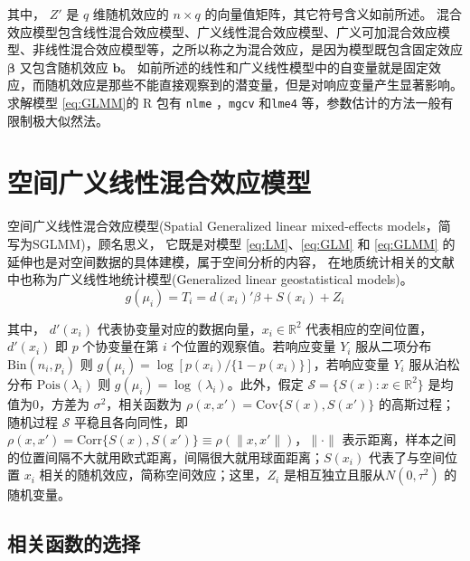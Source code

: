 \documentclass[hyperref, a4paper, UTF8, zihao = -4, linespread = 1.25, scheme = chinese]{ctexbook}
\begin{document}
其中， \(Z'\) 是 \(q\) 维随机效应的 \(n \times q\)
的向量值矩阵，其它符号含义如前所述。
混合效应模型包含线性混合效应模型、广义线性混合效应模型、广义可加混合效应模型、非线性混合效应模型等，之所以称之为混合效应，是因为模型既包含固定效应
\(\boldsymbol{\beta}\) 又包含随机效应 \(\mathbf{b}\)。
如前所述的线性和广义线性模型中的自变量就是固定效应，而随机效应是那些不能直接观察到的潜变量，但是对响应变量产生显著影响。求解模型
\eqref{eq:GLMM}的 R 包有 \texttt{nlme} \citep{R-nlme}，\texttt{mgcv}
\citep{mgcv2017} 和\texttt{lme4}\citep{lme4JSS}
等，参数估计的方法一般有限制极大似然法。

\section{空间广义线性混合效应模型}

空间广义线性混合效应模型(Spatial Generalized linear mixed-effects
models，简写为SGLMM)，顾名思义， 它既是对模型 \eqref{eq:LM}、\eqref{eq:GLM}
和 \eqref{eq:GLMM} 的延伸也是对空间数据的具体建模，属于空间分析的内容，
在地质统计相关的文献中也称为广义线性地统计模型(Generalized linear
geostatistical models)\citep{Diggle2007}。\begin{equation}
g(\mu_i) = T_{i} = d(x_i)'\beta + S(x_i) + Z_i \label{eq:SGLMM}
\end{equation}

其中， \(d'(x_i)\) 代表协变量对应的数据向量，\(x_i \in \mathbb{R}^2\)
代表相应的空间位置，\(d'(x_i)\) 即 \(p\) 个协变量在第 \(i\)
个位置的观察值。若响应变量 \(Y_i\) 服从二项分布
\(\mathrm{Bin}(n_i,p_i)\) 则
\(g(\mu_i) = \log[p(x_i)/\{1-p(x_i)\}]\)，若响应变量 \(Y_i\)
服从泊松分布 \(\mathrm{Pois}(\lambda_i)\) 则
\(g(\mu_i) = \log(\lambda_i)\)。此外，假定
\(\mathcal{S} = \{S(x): x \in \mathbb{R}^2\}\) 是均值为0，方差为
\(\sigma^2\)，相关函数为 \(\rho(x,x') = \mathrm{Cov}\{S(x),S(x')\}\)
的高斯过程；随机过程 \(\mathcal{S}\) 平稳且各向同性，即
\(\rho(x,x') = \mathrm{Corr}\{S(x),S(x')\} \equiv \rho(\|x,x'\|)\)，\(\|\cdot\|\)
表示距离，样本之间的位置间隔不大就用欧式距离，间隔很大就用球面距离；\(S(x_i)\)
代表了与空间位置 \(x_i\) 相关的随机效应，简称空间效应；这里，\(Z_i\)
是相互独立且服从\(N(0,\tau^2)\) 的随机变量。

\subsection{相关函数的选择}
\end{document}

